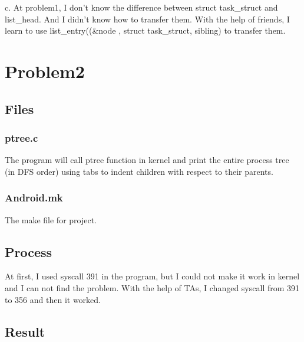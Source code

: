 \documentclass[a4paper,oneside,12pt]{article}
\begin{document}
c. At problem1, I don't know the difference between struct task\_struct and list\_head. And I didn't know how to transfer them. With the help of friends, I learn to use list\_entry((\&node , struct task\_struct, sibling) to transfer them.




\section{Problem2}
\subsection{Files}
\subsubsection{ptree.c}

The program will call ptree function in kernel and print the entire process tree (in DFS order) using tabs to indent children with respect to their parents.

\subsubsection{Android.mk}

The make file for project.

\subsection{Process}

At first, I used syscall 391 in the program, but I could not make it work in kernel and I can not find the problem. With the help of TAs, I changed syscall from 391 to 356 and then it worked. 

\subsection{Result}
\end{document}
